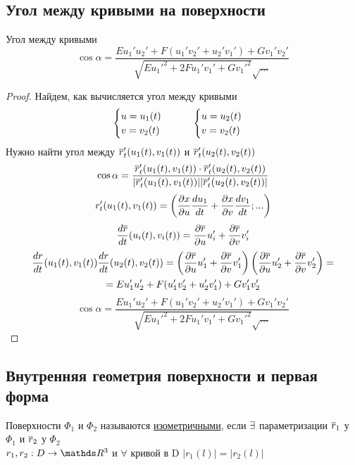 \documentclass[main]{subfiles}
\begin{document}
	\subsection{Угол между кривыми на поверхности}
	\begin{theorem}
		Угол между кривыми
		\[\cos \alpha = \dfrac{E u_1' u_2' + F(u_1' v_2' + u_2' v_1') + G v_1' v_2'}{\sqrt{E u_1'^2 + 2 F u_1' v_1' + G v_1'^2} \sqrt{...}}\]
	\end{theorem}

	\begin{proof}
		Найдем, как вычисляется угол между кривыми
		\[\begin{cases}
		  u=u_1(t)\\
		  v=v_2(t)
		\end{cases} \qquad
		\begin{cases}
		  u=u_2(t)\\
		  v=v_2(t)
		\end{cases}\]
		Нужно найти угол между $\overline{r}_t'(u_1(t), v_1(t))$ и $\overline{r}_t'(u_2(t), v_2(t))$
		\[\cos \alpha = \dfrac{\overline{r}_t'(u_1(t), v_1(t)) \cdot \overline{r}_t'(u_2(t), v_2(t))}{|\overline{r}_t'(u_1(t), v_1(t))| |\overline{r}_t'(u_2(t), v_2(t))|}\]
		\[r_t'(u_1(t), v_1(t)) = \left(\dfrac{\partial x}{\partial u} \dfrac{d u_1}{dt} + \dfrac{\partial x}{\partial v} \dfrac{d v_1}{dt};...\right)\]
		\[\dfrac{d \overline{r}}{dt} (u_i(t), v_i(t)) = \dfrac{\partial \overline{r}}{\partial u} u_i' + \dfrac{\partial \overline{r}}{\partial v} v_i'\]
		\begin{multline*}
		    \dfrac{dr}{dt}(u_1(t),v_1(t)) \dfrac{dr}{dt}(u_2(t),v_2(t)) = \left(\dfrac{\partial \overline{r}}{\partial u} u_1' + \dfrac{\partial \overline{r}}{\partial v} v_1'\right) \left(\dfrac{\partial \overline{r}}{\partial u} u_2' + \dfrac{\partial \overline{r}}{\partial v} v_2'\right) =\\
		    = E u_1' u_2' + F(u_1' v_2'+ u_2' v_1') + G v_1' v_2'
		\end{multline*}
		\[\cos \alpha = \dfrac{E u_1' u_2' + F(u_1' v_2' + u_2' v_1') + G v_1' v_2'}{\sqrt{E u_1'^2 + 2 F u_1' v_1' + G v_1'^2} \sqrt{...}}\]
	\end{proof}

	\subsection{Внутренняя геометрия поверхности и первая форма}

	\begin{definition}
		Поверхности $\Phi_1$ и $\Phi_2$ называются \ul{изометричными}, если $\exists$ параметризации $\overline{r}_1$ у $\Phi_1$ и $\overline{r}_2$ у $\Phi_2$\\
		$r_1,r_2: D \ra \R^3$ и $\forall$ кривой в D $|r_1(l)| = |r_2(l)|$
	\end{definition}
\end{document}
